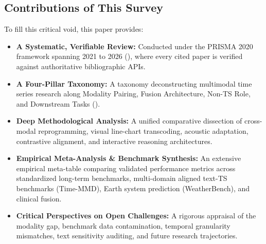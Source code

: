 \subsection{Contributions of This Survey}
To fill this critical void, this paper provides:
\begin{itemize}
    \item \textbf{A Systematic, Verifiable Review:} Conducted under the PRISMA 2020 framework spanning 2021 to 2026 (), where every cited paper is verified against authoritative bibliographic APIs.
    \item \textbf{A Four-Pillar Taxonomy:} A taxonomy deconstructing multimodal time series research along Modality Pairing, Fusion Architecture, Non-TS Role, and Downstream Tasks ().
    \item \textbf{Deep Methodological Analysis:} A unified comparative dissection of cross-modal reprogramming, visual line-chart transcoding, acoustic adaptation, contrastive alignment, and interactive reasoning architectures.
    \item \textbf{Empirical Meta-Analysis \& Benchmark Synthesis:} An extensive empirical meta-table comparing validated performance metrics across standardized long-term benchmarks, multi-domain aligned text-TS benchmarks (Time-MMD), Earth system prediction (WeatherBench), and clinical fusion.
    \item \textbf{Critical Perspectives on Open Challenges:} A rigorous appraisal of the modality gap, benchmark data contamination, temporal granularity mismatches, text sensitivity auditing, and future research trajectories.
\end{itemize}
